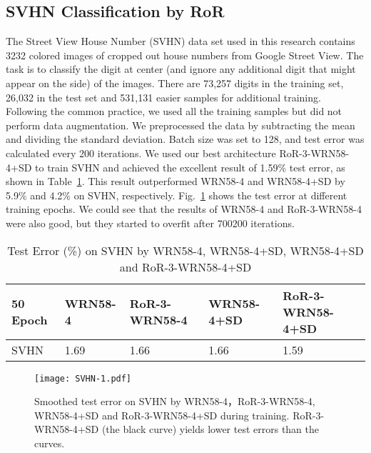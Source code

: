 \documentclass[journal]{IEEEtran}
\begin{document}
\subsection{SVHN Classification by RoR}
The Street View House Number (SVHN) data set used in this research contains 3232 colored images of cropped out house numbers from Google Street View. The task is to classify the digit at center (and ignore any additional digit that might appear on the side) of the images. There are 73,257 digits in the training set, 26,032 in the test set and 531,131 easier samples for additional training. Following the common practice, we used all the training samples but did not perform data augmentation. We preprocessed the data by subtracting the mean and dividing the standard deviation. Batch size was set to 128, and test error was calculated every 200 iterations. We used our best architecture RoR-3-WRN58-4+SD to train SVHN and achieved the excellent result of 1.59\% test error, as shown in Table~\ref{tab:SVHN}. This result outperformed WRN58-4 and WRN58-4+SD by 5.9\% and 4.2\% on SVHN, respectively. Fig.~\ref{fig:SVHN} shows the test error at different training epochs. We could see that the results of WRN58-4 and RoR-3-WRN58-4 were also good, but they started to overfit after 700200 iterations.
\begin{table}[!t]
\renewcommand{\arraystretch}{1.3}
\caption{Test Error (\%) on SVHN by WRN58-4, WRN58-4+SD, WRN58-4+SD and RoR-3-WRN58-4+SD}
\label{tab:SVHN}
\centering
\begin{tabular}{|p{1.1cm}|p{1.3cm}|p{1.3cm}|p{1.3cm}|p{1.7cm}|}
\hline
50 Epoch           &WRN58-4             &RoR-3-WRN58-4      &WRN58-4+SD  &RoR-3-WRN58-4+SD  \\ \hline\hline
SVHN               &1.69                &1.66                &1.66        &1.59    \\\hline
\end{tabular}
\end{table}
\begin{figure}
\centering
\texttt{[image: SVHN-1.pdf]}
\caption{Smoothed test error on SVHN by WRN58-4，RoR-3-WRN58-4, WRN58-4+SD and RoR-3-WRN58-4+SD during training. RoR-3-WRN58-4+SD (the black curve) yields lower test errors than the curves.}
\label{fig:SVHN}
\end{figure} 
\end{document}
